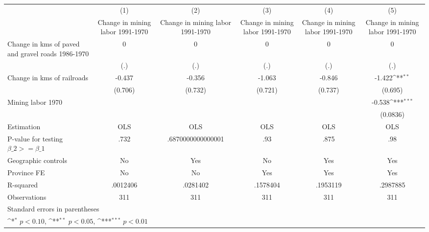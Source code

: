 {
\def\sym#1{\ifmmode^{#1}\else\(^{#1}\)\fi}
\begin{tabular}{l*{5}{c}}
\hline\hline
                    &\multicolumn{1}{c}{(1)}&\multicolumn{1}{c}{(2)}&\multicolumn{1}{c}{(3)}&\multicolumn{1}{c}{(4)}&\multicolumn{1}{c}{(5)}\\
                    &\multicolumn{1}{c}{Change in mining labor 1991-1970}&\multicolumn{1}{c}{Change in mining labor 1991-1970}&\multicolumn{1}{c}{Change in mining labor 1991-1970}&\multicolumn{1}{c}{Change in mining labor 1991-1970}&\multicolumn{1}{c}{Change in mining labor 1991-1970}\\
\hline
Change in kms of paved and gravel roads 1986-1970&           0         &           0         &           0         &           0         &           0         \\
                    &         (.)         &         (.)         &         (.)         &         (.)         &         (.)         \\
[1em]
Change in kms of railroads&      -0.437         &      -0.356         &      -1.063         &      -0.846         &      -1.422\sym{**} \\
                    &     (0.706)         &     (0.732)         &     (0.721)         &     (0.737)         &     (0.695)         \\
[1em]
Mining labor 1970   &                     &                     &                     &                     &      -0.538\sym{***}\\
                    &                     &                     &                     &                     &    (0.0836)         \\
\hline
Estimation          &         OLS         &         OLS         &         OLS         &         OLS         &         OLS         \\
P-value for testing $\beta\_2 >= \beta\_1$&        .732         &.6870000000000001         &         .93         &        .875         &         .98         \\
Geographic controls &          No         &         Yes         &          No         &         Yes         &         Yes         \\
Province FE         &          No         &          No         &         Yes         &         Yes         &         Yes         \\
R-squared           &    .0012406         &    .0281402         &    .1578404         &    .1953119         &    .2987885         \\
Observations        &         311         &         311         &         311         &         311         &         311         \\
\hline\hline
\multicolumn{6}{l}{\footnotesize Standard errors in parentheses}\\
\multicolumn{6}{l}{\footnotesize \sym{*} \(p<0.10\), \sym{**} \(p<0.05\), \sym{***} \(p<0.01\)}\\
\end{tabular}
}
